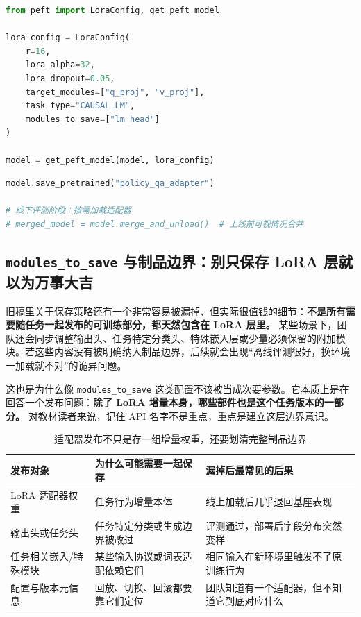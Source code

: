 \begin{lstlisting}[language=Python]
from peft import LoraConfig, get_peft_model

lora_config = LoraConfig(
    r=16,
    lora_alpha=32,
    lora_dropout=0.05,
    target_modules=["q_proj", "v_proj"],
    task_type="CAUSAL_LM",
    modules_to_save=["lm_head"]
)

model = get_peft_model(model, lora_config)
\end{lstlisting}

\begin{lstlisting}[language=Python]
model.save_pretrained("policy_qa_adapter")

# 线下评测阶段：按需加载适配器
# merged_model = model.merge_and_unload()  # 上线前可视情况合并
\end{lstlisting}

\subsection{\texttt{modules\_to\_save} 与制品边界：别只保存 LoRA 层就以为万事大吉}
旧稿里关于保存策略还有一个非常容易被漏掉、但实际很值钱的细节：\textbf{不是所有需要随任务一起发布的可训练部分，都天然包含在 LoRA 层里。} 某些场景下，团队还会同步调整输出头、任务特定分类头、特殊嵌入层或少量必须保留的附加模块。若这些内容没有被明确纳入制品边界，后续就会出现“离线评测很好，换环境一加载就不对”的诡异问题。

这也是为什么像 \texttt{modules\_to\_save} 这类配置不该被当成次要参数。它本质上是在回答一个发布问题：\textbf{除了 LoRA 增量本身，哪些部件也是这个任务版本的一部分。} 对教材读者来说，记住 API 名字不是重点，重点是建立这层边界意识。

\begin{table}[H]
\centering
\small
\begin{tabularx}{\textwidth}{>{\raggedright\arraybackslash}p{3cm}>{\raggedright\arraybackslash}p{3.2cm}>{\raggedright\arraybackslash}X}
\toprule
\textbf{发布对象} & \textbf{为什么可能需要一起保存} & \textbf{漏掉后最常见的后果} \\
\midrule
LoRA 适配器权重 & 任务行为增量本体 & 线上加载后几乎退回基座表现 \\
输出头或任务头 & 任务特定分类或生成边界被改过 & 评测通过，部署后字段分布突然变样 \\
任务相关嵌入/特殊模块 & 某些输入协议或词表适配依赖它们 & 相同输入在新环境里触发不了原训练行为 \\
配置与版本元信息 & 回放、切换、回滚都要靠它们定位 & 团队知道有一个适配器，但不知道它到底对应什么 \\
\bottomrule
\end{tabularx}
\caption{适配器发布不只是存一组增量权重，还要划清完整制品边界}
\label{tab:adapter-artifact-boundary}
\end{table}

